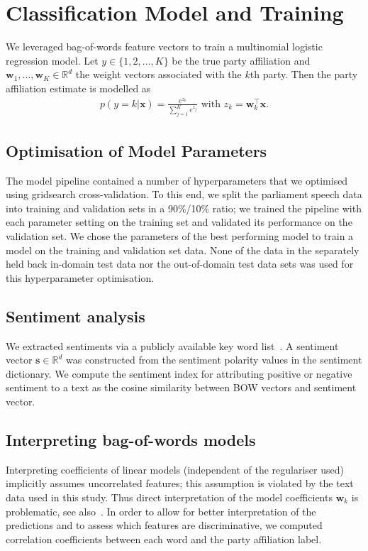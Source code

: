 \documentclass[11pt]{article}
\renewcommand{\vec}[1]{\mathbf{#1}}
\newcommand{\R}{\mathds{R}}
\begin{document}
\section{Classification Model and Training}\label{sec:model}
We leveraged bag-of-words feature vectors to train a multinomial logistic regression model. Let $y\in\{1,2,\dots,K\}$ be the true party affiliation and $\vec{w}_1,\dots,\vec{w}_K\in\R^{d}$ the weight vectors associated with the $k$th party. Then the party affiliation estimate is modelled as
\begin{eqnarray}\label{eq:logreg_multiclass}
p(y=k|\vec{x}) = \frac{e^{z_k}}{\sum_{j=1}^K e^{z_j}}  \textrm{ with }  z_k=\vec{w}_k^{\top}\vec{x}.
\end{eqnarray}

\subsection{Optimisation of Model Parameters}\label{sec:crossvalidation}
The model pipeline contained a number of hyperparameters that we optimised using gridsearch cross-validation. To this end, we split the parliament speech data into training and validation sets in a 90\%/10\% ratio; we trained the pipeline with each parameter setting on the training set and validated its performance on the validation set. We chose the parameters of the best performing model to train a model on the training and validation set data. None of the data in the separately held back in-domain test data nor the out-of-domain test data sets was used for this hyperparameter optimisation. 
%
\subsection{Sentiment analysis}\label{sec:sentiment_analysis_methods}
We extracted sentiments via a publicly available key word list~\cite{remquahey2010}. A sentiment vector $\vec{s}\in\R^d$ was constructed from the sentiment polarity values in the sentiment dictionary. We compute the sentiment index for attributing positive or negative sentiment to a text as the cosine similarity between BOW vectors and sentiment vector.

\subsection{Interpreting bag-of-words models}\label{sec:correlations_methods}
Interpreting coefficients of linear models (independent of the regulariser used) implicitly assumes uncorrelated features; this assumption is violated by the text data used in this study. Thus direct interpretation of the model coefficients $\vec{w}_k$ is problematic, see also~\cite{Zien2009, Haufe2013}. In order to allow for better interpretation of the predictions and to assess which features are discriminative, we computed correlation coefficients between each word and the party affiliation label. 
\end{document}
